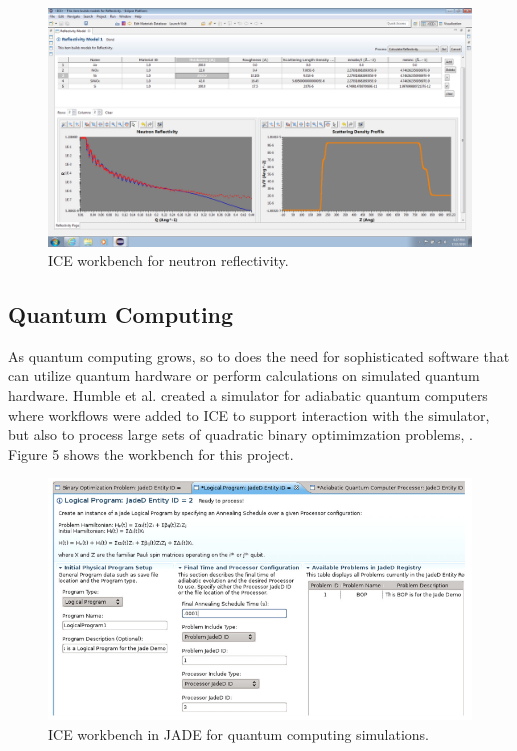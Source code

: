 \begin{figure}[htbp]
\centering
\includegraphics[width=\textwidth]{images/reflectivity-screenshot.png}
\caption{ICE workbench for neutron reflectivity.}
\end{figure}

\subsection{Quantum Computing}\label{quantum-computing}

As quantum computing grows, so to does the need for sophisticated
software that can utilize quantum hardware or perform calculations on
simulated quantum hardware. Humble et al. created a simulator for
adiabatic quantum computers where workflows were added to ICE to support
interaction with the simulator, but also to process large sets of
quadratic binary optimimzation problems, \cite{humble_integrated_2014}. Figure 5
shows the workbench for this project.

\begin{figure}[htbp]
\centering
\includegraphics[width=\textwidth]{images/jaded.png}
\caption{ICE workbench in JADE for quantum computing simulations.}
\end{figure}

